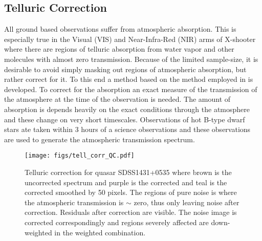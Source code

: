 \documentclass{aa}    %
\newcommand{\figlabel}[1]{\label{fig:#1}}
\newcommand{\sectlabel}[1]{\label{sect:#1}}
\begin{document}




\subsection{Telluric Correction}   \sectlabel{telluric}

All ground based observations suffer from atmospheric absorption. This is especially true in the Visual (VIS) and Near-Infra-Red (NIR) arms of X-shooter where there are regions of telluric absorption from water vapor and other molecules with almost zero transmission. Because of the limited sample-size, it is desirable to avoid simply masking out regions of atmospheric absorption, but rather correct for it. To this end a method based on the method employed in \citet{Chen2014} is developed.
To correct for the absorption an exact measure of the transmission of the atmosphere at the time of the observation is needed. The amount of absorption is depends heavily on the exact conditions through the atmosphere and these change on very short timescales. Observations of hot B-type dwarf stars ate taken within 3 hours of a science observations and these observations are used to generate the atmospheric transmission spectrum. 

\begin{figure}[t!]
  \centering
  \texttt{[image: figs/tell\_corr\_QC.pdf]}
  \caption[]{Telluric correction for quasar SDSS1431+0535 where brown is the uncorrected spectrum and purple is the corrected and teal is the corrected smoothed by 50 pixels. The regions of pure noise is where the atmospheric transmission is $\sim$ zero, thus only leaving noise after correction. Residuals after correction are visible. The noise image is corrected correspondingly and regions severely affected are down-weighted in the weighted combination.}
\figlabel{telluric_qc}
\end{figure}
\end{document}
